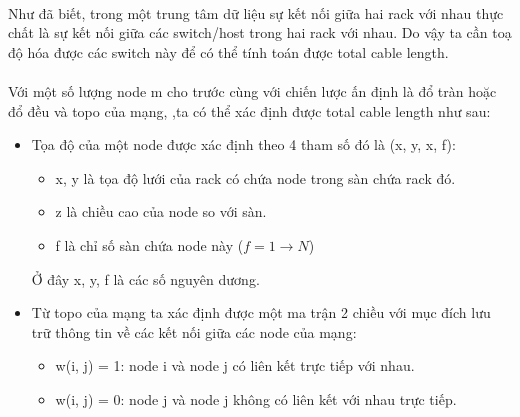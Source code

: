 \documentclass[../report.tex]{subfiles}
\begin{document}
\paragraph*{}Như đã biết, trong một trung tâm dữ liệu sự kết nối giữa hai rack với nhau thực chất là sự kết nối giữa các switch/host trong hai rack với nhau. Do vậy ta cần toạ độ hóa được các switch này để có thể tính toán được total cable length.
\paragraph*{} Với một số lượng node m cho trước cùng với chiến lược ấn định là đổ tràn hoặc đổ đều và topo của mạng, ,ta có thể xác định được total cable length như sau:
\begin{itemize}
    \item Tọa độ của một node được xác định theo 4 tham số đó là (x, y, x, f):
        \begin{itemize}
        \item x, y là tọa độ lưới của rack có chứa node trong sàn chứa rack đó.
        \item z là chiều cao của node so với sàn.
        \item f là chỉ số sàn chứa node này ($f = 1 \rightarrow N$)
        \end{itemize}
        Ở đây x, y, f là các số nguyên dương.

    \item Từ topo của mạng ta xác định được một ma trận 2 chiều với mục đích lưu trữ thông tin về các kết nối giữa các node của mạng:
        \begin{itemize}
            \item w(i, j) = 1: node i và node j có liên kết trực tiếp với nhau.
            \item w(i, j) = 0: node j và node j không có liên kết với nhau trực tiếp.
        \end{itemize}


\end{itemize}
\end{document}
